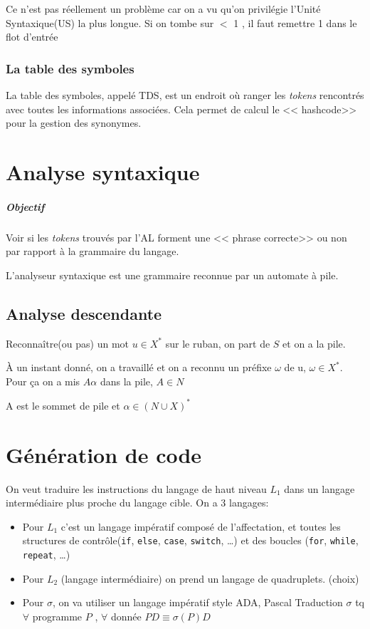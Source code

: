 \documentclass[12pt,a4paper,openany]{book}
\newcommand{\tokens}{\textit{tokens} }
\begin{document}
	Ce n'est pas réellement un problème car on a vu qu'on privilégie l'Unité Syntaxique(US) la plus longue.
	Si on tombe sur $<$ 1 , il faut remettre 1 dans le flot d’entrée

	\subsection{La table des symboles}
	La table des symboles, appelé TDS, est un endroit où ranger les \tokens rencontrés avec toutes les informations associées. Cela permet de calcul le <<
	hashcode>> pour la gestion des synonymes.

	\chapter{Analyse syntaxique}
	\paragraph{Objectif} Voir si les \tokens trouvés par l'AL forment une << phrase correcte>> ou non par rapport à la grammaire du langage.

	L'analyseur syntaxique est une grammaire reconnue par un automate à pile.

	\section{Analyse descendante}
Reconnaître(ou pas) un mot $u \in X^*$ sur le ruban, on part de $S$ et on a la pile.

À un instant donné, on a travaillé et on a reconnu un préfixe $\omega$ de u, $\omega \in X^*$.
Pour ça on a mis $A\alpha$ dans la pile, $A \in N$

A est le sommet de pile et $\alpha \in (N \cup X)^*$
	\chapter{Génération de code}
	On veut traduire les instructions du langage de haut niveau $L_1$ dans un
	langage intermédiaire plus proche du langage cible. On a 3 langages:
	\begin{itemize}
		\item Pour $L_1$ c’est un langage impératif composé de l'affectation, et toutes les structures de 
			contrôle(\texttt{if}, \texttt{else}, \texttt{case}, \texttt{switch}, \ldots) et des boucles (\texttt{for},
			\texttt{while}, \texttt{repeat}, \ldots)
		\item Pour $L_2$ (langage intermédiaire) on prend un langage de quadruplets. (choix)
		\item Pour $\sigma$, on va utiliser un langage impératif style ADA, Pascal
			Traduction $\sigma$ tq $\forall$ programme $P$ , $\forall$ donnée $PD \equiv \sigma(P)D$
	\end{itemize}
\end{document}
